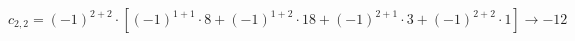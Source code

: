 \documentclass[10pt,convert]{standalone}
\begin{document}
$ c_{2,2} = (-1)^{2+2} \cdot [(-1)^{1+1} \cdot 8 + (-1)^{1 + 2} \cdot 18 + (-1)^{2 + 1} \cdot 3 + (-1)^{2 + 2} \cdot 1 ] \rightarrow -12 $
\end{document}
